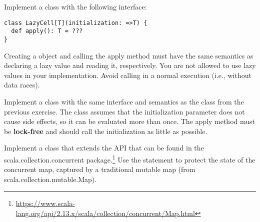 \documentclass[11pt]{article}
\begin{document}
\begin{myExercise}
Implement a  class with the following interface:
\begin{lstlisting}
class LazyCell[T](initialization: =>T) {
  def apply(): T = ???
}
\end{lstlisting}
Creating a  object and calling the apply method must have the
same semantics as declaring a lazy value and reading it, respectively.
You are not allowed to use lazy values in your implementation.
Avoid calling  in a normal execution (i.e., without data races).
\end{myExercise}

\begin{myExercise}
Implement a  class with the same interface and semantics as the  class from the previous exercise. The  class assumes that the initialization parameter does not cause side effects, so it can be evaluated more than once.
The apply method must be \textbf{lock-free} and should call the initialization as little as possible.
\end{myExercise}

\begin{myExercise}
Implement a  class that extends the  API that can be found in the scala.collection.concurrent package.\footnote{\url{https://www.scala-lang.org/api/2.13.x/scala/collection/concurrent/Map.html}} Use the  statement to protect the state of the concurrent map, captured by a traditional mutable map (from scala.collection.mutable.Map).
\end{myExercise}


\end{document}
